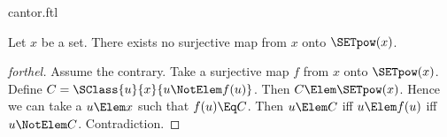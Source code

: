 \documentclass{stex}
\begin{document}
\begin{smodule}{cantor.ftl}


\begin{theorem}[forthel,title=Cantor's Theorem,name=Cantor I]
  Let $x$ be a set.
  There exists no surjective map from $x$ onto $\SETpow(x)$.
\end{theorem}
\begin{proof}[forthel]
  Assume the contrary.
  Take a surjective map $f$ from $x$ onto $\SETpow(x)$.
  Define $C = \SClass{u}{x}{u \NotElem f(u)}$.
  Then $C \Elem \SETpow(x)$.
  Hence we can take a $u \Elem x$ such that $f(u) \Eq C$.
  Then $u \Elem C$ iff $u \Elem f(u)$ iff $u \NotElem C$.
  Contradiction.
\end{proof}
\end{smodule}
\end{document}
